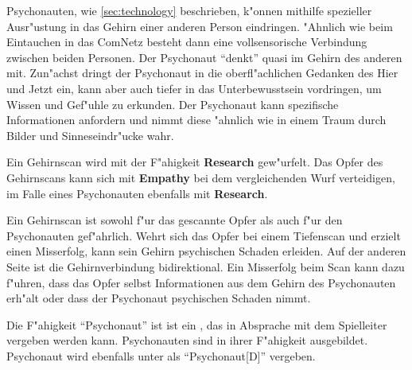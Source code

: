 Psychonauten, wie \cref{sec:technology} beschrieben, k"onnen mithilfe spezieller Ausr"ustung in das Gehirn einer anderen Person eindringen. "Ahnlich wie beim Eintauchen in das ComNetz besteht dann eine vollsensorische Verbindung zwischen beiden Personen. Der Psychonaut ``denkt'' quasi im Gehirn des anderen mit. Zun"achst dringt der Psychonaut in die oberfl"achlichen Gedanken des Hier und Jetzt ein, kann aber auch tiefer in das Unterbewusstsein vordringen, um Wissen und Gef"uhle zu erkunden. Der Psychonaut kann spezifische Informationen anfordern und nimmt diese "ahnlich wie in einem Traum durch Bilder und Sinneseindr"ucke wahr.

Ein Gehirnscan wird mit der F"ahigkeit \textbf{Research} gew"urfelt. Das Opfer des Gehirnscans kann sich mit \textbf{Empathy} bei dem vergleichenden Wurf verteidigen, im Falle eines Psychonauten ebenfalls mit \textbf{Research}.

Ein Gehirnscan ist sowohl f"ur das gescannte Opfer als auch f"ur den Psychonauten gef"ahrlich. Wehrt sich das Opfer bei einem Tiefenscan und erzielt einen Misserfolg, kann sein Gehirn psychischen Schaden erleiden. Auf der anderen Seite ist die Gehirnverbindung bidirektional. Ein Misserfolg beim Scan kann dazu f"uhren, dass das Opfer selbst Informationen aus dem Gehirn des Psychonauten erh"alt oder dass der Psychonaut psychischen Schaden nimmt.

Die F"ahigkeit ``Psychonaut'' ist ist ein , das in Absprache mit dem Spielleiter vergeben werden kann. Psychonauten sind in ihrer F"ahigkeit ausgebildet. Psychonaut wird ebenfalls unter  als ``Psychonaut[D]'' vergeben.
